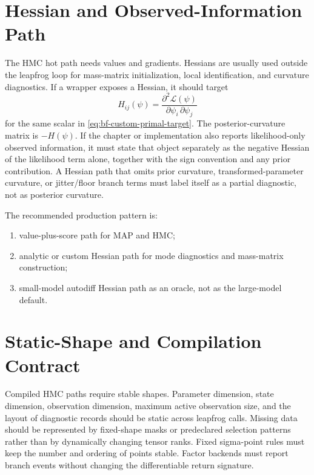 \section{Hessian and Observed-Information Path}
\label{sec:bf-custom-gradient-hessian-path}

The HMC hot path needs values and gradients.  Hessians are usually used outside
the leapfrog loop for mass-matrix initialization, local identification, and
curvature diagnostics.  If a wrapper exposes a Hessian, it should target
\[
  H_{ij}(\psi)
  =
  \frac{\partial^2\mathcal{L}(\psi)}
       {\partial\psi_i\,\partial\psi_j}
\]
for the same scalar in \eqref{eq:bf-custom-primal-target}.  The posterior-curvature matrix is $-H(\psi)$. If the chapter or implementation also reports likelihood-only observed information, it must state that object separately as the negative Hessian of the likelihood term alone, together with the sign convention and any prior contribution.  A Hessian path
that omits prior curvature, transformed-parameter curvature, or jitter/floor
branch terms must label itself as a partial diagnostic, not as posterior
curvature.

The recommended production pattern is:
\begin{enumerate}[label=(\roman*)]
  \item value-plus-score path for MAP and HMC;
  \item analytic or custom Hessian path for mode diagnostics and mass-matrix
    construction;
  \item small-model autodiff Hessian path as an oracle, not as the large-model
    default.
\end{enumerate}

\section{Static-Shape and Compilation Contract}
\label{sec:bf-custom-gradient-static-shapes}

Compiled HMC paths require stable shapes.  Parameter dimension, state dimension,
observation dimension, maximum active observation size, and the layout of
diagnostic records should be static across leapfrog calls.  Missing data should
be represented by fixed-shape masks or predeclared selection patterns rather
than by dynamically changing tensor ranks.  Fixed sigma-point rules must keep the
number and ordering of points stable.  Factor backends must report branch events
without changing the differentiable return signature.

